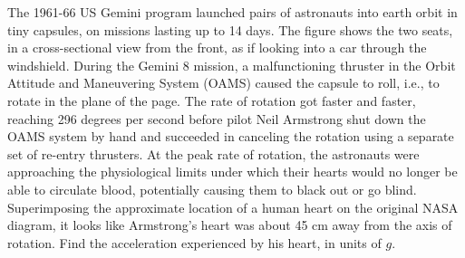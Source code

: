 The 1961-66 US Gemini program launched pairs of astronauts into earth
orbit in tiny capsules, on missions lasting up to 14 days. The figure
shows the two seats, in a cross-sectional view from the front, as if looking
into a car through the windshield.  During the Gemini 8 mission, a
malfunctioning thruster in the Orbit Attitude and Maneuvering System
(OAMS) caused the capsule to roll, i.e., to rotate in the plane of the
page.  The rate of rotation got faster and faster, reaching 296
degrees per second before pilot Neil Armstrong shut down the OAMS
system by hand and succeeded in canceling the rotation using a
separate set of re-entry thrusters. At the peak rate of rotation, the
astronauts were approaching the physiological limits under which their
hearts would no longer be able to circulate blood, potentially causing
them to black out or go blind. Superimposing the approximate location
of a human heart on the original NASA diagram, it looks like
Armstrong's heart was about 45 cm away from the axis of rotation. Find
the acceleration experienced by his heart, in units of $g$.\answercheck
